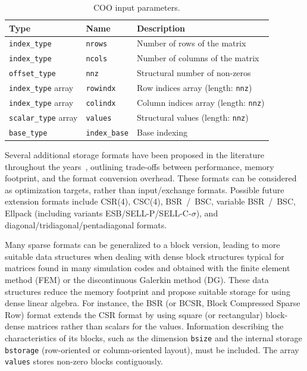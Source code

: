 \documentclass[manuscript,review]{acmart}
\begin{document}
\begin{table}[htbp]
  \centering
  \caption{COO input parameters.}
  \label{tab:coo_param}
  \begin{tabularx}{\linewidth}{l l X}
    \toprule
    \textbf{Type} & \textbf{Name} & \textbf{Description} \\
    \midrule
    \texttt{index\_type}        & \texttt{nrows}      & Number of rows of the matrix \\
    \texttt{index\_type}        & \texttt{ncols}      & Number of columns of the matrix \\
    \texttt{offset\_type}       & \texttt{nnz}        & Structural number of non-zeros \\
    \texttt{index\_type} array  & \texttt{rowindx}    & Row indices array (length: \texttt{nnz}) \\
    \texttt{index\_type} array  & \texttt{colindx}    & Column indices array (length: \texttt{nnz}) \\
    \texttt{scalar\_type} array & \texttt{values}     & Structural values (length: \texttt{nnz}) \\
    \texttt{base\_type}         & \texttt{index\_base}& Base indexing \\
    \bottomrule
  \end{tabularx}
\end{table}




Several additional storage formats have been proposed in the literature throughout the years~\cite{langr2015evaluation}, outlining trade-offs between performance, memory footprint, and the format conversion overhead. These formats can be considered as optimization targets, rather than input/exchange formats. 
Possible future extension formats include CSR(4), CSC(4), BSR~/~BSC, variable BSR~/~BSC, Ellpack (including variants ESB/SELL-P/SELL-C-$\sigma$), and diagonal/tridiagonal/pentadiagonal formats. 


Many sparse formats can be generalized to a block version, leading to more suitable data structures when dealing with dense block structures typical for matrices found in many simulation codes and obtained with the finite element method (FEM) or the discontinuous Galerkin method (DG). These data structures reduce the memory footprint and propose suitable storage for using dense linear algebra.  
For instance, the BSR (or BCSR, Block Compressed Sparse Row) format extends the CSR format by using square (or rectangular) block-dense matrices rather than scalars for the values. Information describing the characteristics of its blocks, such as the dimension \texttt{bsize} and the internal storage \texttt{bstorage} (row-oriented or column-oriented layout), must be included. The array \texttt{values} stores non-zero blocks contiguously.
\end{document}
